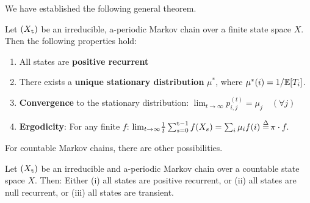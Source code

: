 We have established the following general theorem.

\begin{theorem}
Let $({X_{\tt t}})$ be an irreducible,  a-periodic Markov chain over
a finite state space $X$.  Then the following properties hold:
\begin{enumerate}
\item All states are \textbf{positive recurrent}
\item There exists a \textbf{unique stationary distribution}
${\mu^*}$, where $\mu^*(i)=1/\mathbb{E}[T_i]$.
\item \textbf{Convergence} to the stationary distribution: ${\lim _{t \to \infty }}p_{i,j}^{(t)} = {\mu_j}\quad (\forall j)$
\item \textbf{Ergodicity}: For any finite $f$: ${\lim _{t \to \infty }}\frac{1}{t}\sum\nolimits_{s = 0}^{\ttime - 1} {f({X_s}) = \sum\nolimits_i {\mu_i f(i) \buildrel \Delta \over = } } \,\pi  \cdot f.$
\end{enumerate}
\end{theorem}

%
%
%
%

For countable Markov chains, there are other possibilities.

\begin{theorem}
Let $({X_{\tt t}})$ be an irreducible and a-periodic Markov chain
over a countable state space $X$.  Then:
Either (i) all states are positive recurrent, or (ii) all states are null recurrent, or (iii) all states are transient.
\end{theorem}


